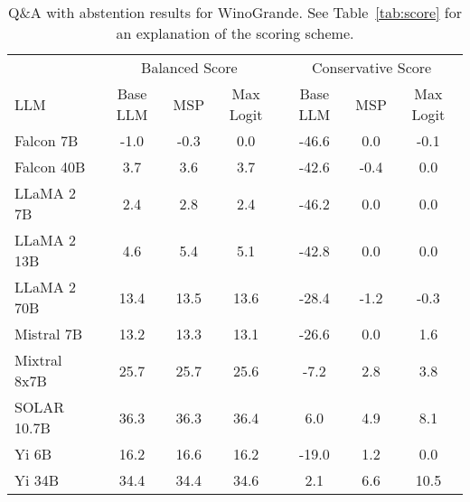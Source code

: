 \begin{table*}
\centering
\caption{Q\&A with abstention results for WinoGrande. See Table~\ref{tab:score} for an explanation of the scoring scheme.}
\label{tab:winogrande_score}
\begin{tabular}{lcccccc}
\toprule
& \multicolumn{3}{c}{Balanced Score} & \multicolumn{3}{c}{Conservative Score} \\ 
LLM & Base LLM & MSP & Max Logit & Base LLM & MSP & Max Logit\\ 
\cmidrule(lr){1-1} \cmidrule(lr){2-4} \cmidrule(lr){5-7}
Falcon 7B & -1.0 & -0.3 & 0.0 & -46.6 & 0.0 & -0.1\\
Falcon 40B & 3.7 & 3.6 & 3.7 & -42.6 & -0.4 & 0.0\\
LLaMA 2 7B & 2.4 & 2.8 & 2.4 & -46.2 & 0.0 & 0.0\\
LLaMA 2 13B & 4.6 & 5.4 & 5.1 & -42.8 & 0.0 & 0.0\\
LLaMA 2 70B & 13.4 & 13.5 & 13.6 & -28.4 & -1.2 & -0.3\\
Mistral 7B & 13.2 & 13.3 & 13.1 & -26.6 & 0.0 & 1.6\\
Mixtral 8x7B & 25.7 & 25.7 & 25.6 & -7.2 & 2.8 & 3.8\\
SOLAR 10.7B & 36.3 & 36.3 & 36.4 & 6.0 & 4.9 & 8.1\\
Yi 6B & 16.2 & 16.6 & 16.2 & -19.0 & 1.2 & 0.0\\
Yi 34B & 34.4 & 34.4 & 34.6 & 2.1 & 6.6 & 10.5\\
\bottomrule
\end{tabular}
\end{table*}
